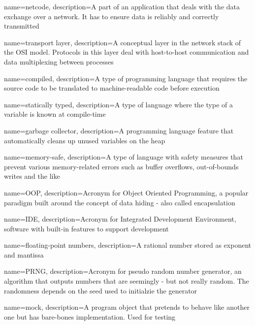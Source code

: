 {
    name=netcode,
    description={A part of an application that deals with the data exchange over a network. It has to ensure data is reliably and correctly transmitted}
}

{
    name=transport layer,
    description={A conceptual layer in the network stack of the OSI model. Protocols in this layer deal with host-to-host communication and data multiplexing between processes}
}

{
    name=compiled,
    description={A type of programming language that requires the source code to be translated to machine-readable code before execution}
}

{
    name=statically typed,
    description={A type of language where the type of a variable is known at compile-time}
}

{
    name=garbage collector,
    description={A programming language feature that automatically cleans up unused variables on the heap}
}

{
    name=memory-safe,
    description={A type of language with safety measures that prevent various memory-related errors such as buffer overflows, out-of-bounds writes and the like}
}

{
    name=OOP,
    description={Acronym for Object Oriented Programming, a popular paradigm built around the concept of data hiding - also called encapsulation}
}

{
    name=IDE,
    description={Acronym for Integrated Development Environment, software with built-in features to support development}
}

{
    name=floating-point numbers,
    description={A rational number stored as exponent and mantissa}
}

{
    name=PRNG,
    description={Acronym for pseudo random number generator, an algorithm that outputs numbers that are seemingly - but not really random. The randomness depends on the seed used to initialzie the generator}
}

{
    name=mock,
    description={A program object that pretends to behave like another one but has bare-bones implementation. Used for testing}
}